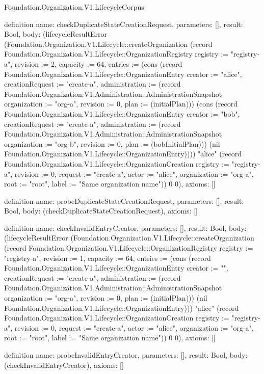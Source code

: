 \begin{lexlean}{Foundation.Organization.V1.LifecycleCorpus}
\begin{semanticmodule}
definition{
  name: checkDuplicateStateCreationRequest,
  parameters: [],
  result: Bool,
  body: (lifecycleResultError (Foundation.Organization.V1.Lifecycle::createOrganization (record Foundation.Organization.V1.Lifecycle::OrganizationRegistry {registry := "registry-a", revision := 2, capacity := 64, entries := (cons (record Foundation.Organization.V1.Lifecycle::OrganizationEntry {creator := "alice", creationRequest := "create-a", administration := (record Foundation.Organization.V1.Administration::AdministrationSnapshot {organization := "org-a", revision := 0, plan := (initialPlan)})}) (cons (record Foundation.Organization.V1.Lifecycle::OrganizationEntry {creator := "bob", creationRequest := "create-a", administration := (record Foundation.Organization.V1.Administration::AdministrationSnapshot {organization := "org-b", revision := 0, plan := (bobInitialPlan)})}) (nil Foundation.Organization.V1.Lifecycle::OrganizationEntry)))}) "alice" (record Foundation.Organization.V1.Lifecycle::OrganizationCreation {registry := "registry-a", revision := 0, request := "create-a", actor := "alice", organization := "org-a", root := "root", label := "Same organization name"})) 0 0),
  axioms: []
}

definition{
  name: probeDuplicateStateCreationRequest,
  parameters: [],
  result: Bool,
  body: (checkDuplicateStateCreationRequest),
  axioms: []
}

definition{
  name: checkInvalidEntryCreator,
  parameters: [],
  result: Bool,
  body: (lifecycleResultError (Foundation.Organization.V1.Lifecycle::createOrganization (record Foundation.Organization.V1.Lifecycle::OrganizationRegistry {registry := "registry-a", revision := 1, capacity := 64, entries := (cons (record Foundation.Organization.V1.Lifecycle::OrganizationEntry {creator := "", creationRequest := "create-a", administration := (record Foundation.Organization.V1.Administration::AdministrationSnapshot {organization := "org-a", revision := 0, plan := (initialPlan)})}) (nil Foundation.Organization.V1.Lifecycle::OrganizationEntry))}) "alice" (record Foundation.Organization.V1.Lifecycle::OrganizationCreation {registry := "registry-a", revision := 0, request := "create-a", actor := "alice", organization := "org-a", root := "root", label := "Same organization name"})) 0 0),
  axioms: []
}

definition{
  name: probeInvalidEntryCreator,
  parameters: [],
  result: Bool,
  body: (checkInvalidEntryCreator),
  axioms: []
}


\end{semanticmodule}
\end{lexlean}
